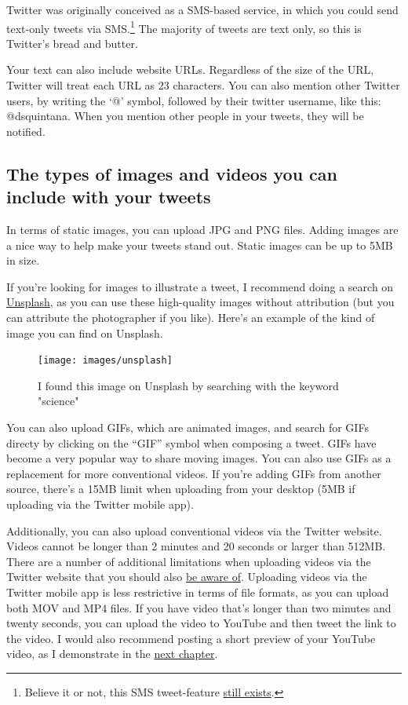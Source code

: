 \documentclass[]{book}
\let\rmarkdownfootnote\footnote%
\def\footnote{\protect\rmarkdownfootnote}
\begin{document}
Twitter was originally conceived as a SMS-based service, in which you could send text-only tweets via SMS.\footnote{Believe it or not, this SMS tweet-feature \href{https://help.twitter.com/en/using-twitter/twitter-sms}{still exists}.} The majority of tweets are text only, so this is Twitter's bread and butter.

Your text can also include website URLs. Regardless of the size of the URL, Twitter will treat each URL as 23 characters. You can also mention other Twitter users, by writing the `@' symbol, followed by their twitter username, like this: @dsquintana. When you mention other people in your tweets, they will be notified.

\hypertarget{the-types-of-images-and-videos-you-can-include-with-your-tweets}{%
\subsection{The types of images and videos you can include with your tweets}\label{the-types-of-images-and-videos-you-can-include-with-your-tweets}}

In terms of static images, you can upload JPG and PNG files. Adding images are a nice way to help make your tweets stand out. Static images can be up to 5MB in size.

If you're looking for images to illustrate a tweet, I recommend doing a search on \href{https://unsplash.com/}{Unsplash}, as you can use these high-quality images without attribution (but you can attribute the photographer if you like). Here's an example of the kind of image you can find on Unsplash.

\begin{figure}

\texttt{[image: images/unsplash]} \hfill{}

\caption{I found this image on Unsplash by searching with the keyword "science"}\label{fig:unnamed-chunk-3}
\end{figure}

You can also upload GIFs, which are animated images, and search for GIFs directy by clicking on the ``GIF'' symbol when composing a tweet. GIFs have become a very popular way to share moving images. You can also use GIFs as a replacement for more conventional videos. If you're adding GIFs from another source, there's a 15MB limit when uploading from your desktop (5MB if uploading via the Twitter mobile app).

Additionally, you can also upload conventional videos via the Twitter website. Videos cannot be longer than 2 minutes and 20 seconds or larger than 512MB. There are a number of additional limitations when uploading videos via the Twitter website that you should also \href{https://help.twitter.com/en/using-twitter/twitter-videos}{be aware of}. Uploading videos via the Twitter mobile app is less restrictive in terms of file formats, as you can upload both MOV and MP4 files. If you have video that's longer than two minutes and twenty seconds, you can upload the video to YouTube and then tweet the link to the video. I would also recommend posting a short preview of your YouTube video, as I demonstrate in the \protect\hyperlink{composing-tweets}{next chapter}.
\end{document}
